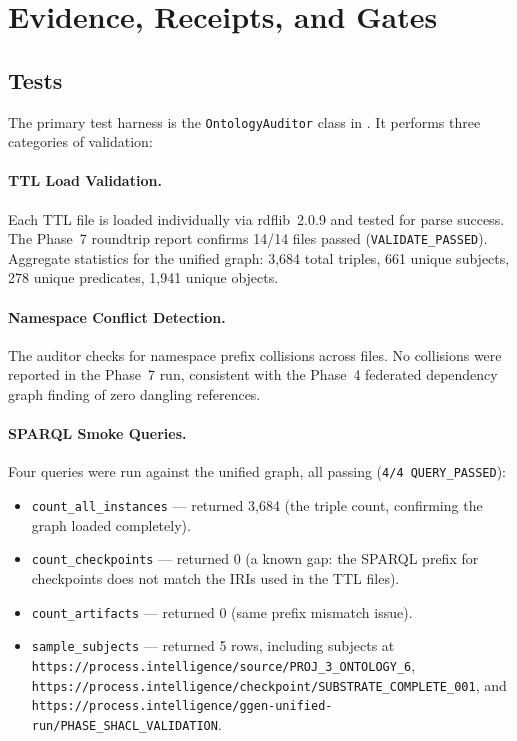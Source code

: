
\section{Evidence, Receipts, and Gates}
\label{sec:research-open-ontologies-evidence}

\subsection{Tests}
\label{sec:research-open-ontologies-tests}

The primary test harness is the \texttt{OntologyAuditor} class in
. It performs three categories of validation:

\paragraph{TTL Load Validation.}
Each TTL file is loaded individually via rdflib~2.0.9 and tested for parse success.
The Phase~7 roundtrip report confirms 14/14 files passed (\texttt{VALIDATE\_PASSED}).
Aggregate statistics for the unified graph: 3{,}684 total triples, 661 unique subjects,
278 unique predicates, 1{,}941 unique objects.

\paragraph{Namespace Conflict Detection.}
The auditor checks for namespace prefix collisions across files. No collisions were
reported in the Phase~7 run, consistent with the Phase~4 federated dependency graph
finding of zero dangling references.

\paragraph{SPARQL Smoke Queries.}
Four queries were run against the unified graph, all passing (\texttt{4/4 QUERY\_PASSED}):
\begin{itemize}
  \item \texttt{count\_all\_instances} --- returned 3{,}684 (the triple count,
        confirming the graph loaded completely).
  \item \texttt{count\_checkpoints} --- returned 0 (a known gap: the SPARQL prefix
        for checkpoints does not match the IRIs used in the TTL files).
  \item \texttt{count\_artifacts} --- returned 0 (same prefix mismatch issue).
  \item \texttt{sample\_subjects} --- returned 5 rows, including subjects at
        \texttt{https://process.intelligence/source/PROJ\_3\_ONTOLOGY\_6},
        \texttt{https://process.intelligence/checkpoint/SUBSTRATE\_COMPLETE\_001},
        and \texttt{https://process.intelligence/ggen-unified-run/PHASE\_SHACL\_VALIDATION}.
\end{itemize}

